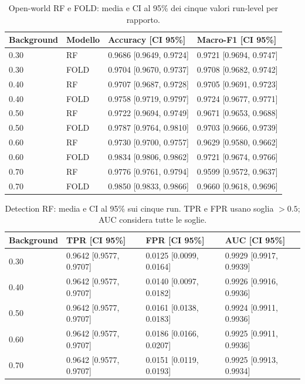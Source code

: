 \documentclass[11pt,a4paper]{article}
\begin{document}
\clearpage
\begin{table}[htbp]
\centering\scriptsize
\caption{Open-world RF e FOLD: media e CI al 95\% dei cinque valori run-level per rapporto.}
\label{tab:crossrun-open-performance-complete}
\begin{tabular}{llll}
\toprule
Background & Modello & Accuracy [CI 95\%] & Macro-F1 [CI 95\%] \\
\midrule
0.30 & RF & 0.9686 [0.9649, 0.9724] & 0.9721 [0.9694, 0.9747] \\
0.30 & FOLD & 0.9704 [0.9670, 0.9737] & 0.9708 [0.9682, 0.9742] \\
0.40 & RF & 0.9707 [0.9687, 0.9728] & 0.9705 [0.9691, 0.9723] \\
0.40 & FOLD & 0.9758 [0.9719, 0.9797] & 0.9724 [0.9677, 0.9771] \\
0.50 & RF & 0.9722 [0.9694, 0.9749] & 0.9671 [0.9653, 0.9688] \\
0.50 & FOLD & 0.9787 [0.9764, 0.9810] & 0.9703 [0.9666, 0.9739] \\
0.60 & RF & 0.9730 [0.9700, 0.9757] & 0.9629 [0.9580, 0.9662] \\
0.60 & FOLD & 0.9834 [0.9806, 0.9862] & 0.9721 [0.9674, 0.9766] \\
0.70 & RF & 0.9776 [0.9761, 0.9794] & 0.9599 [0.9572, 0.9637] \\
0.70 & FOLD & 0.9850 [0.9833, 0.9866] & 0.9660 [0.9618, 0.9696] \\
\bottomrule
\end{tabular}
\end{table}
\begin{table}[htbp]
\centering\scriptsize
\caption{Detection RF: media e CI al 95\% sui cinque run. TPR e FPR usano soglia $>0.5$; AUC considera tutte le soglie.}
\label{tab:crossrun-open-detection-rf}
\begin{tabular}{llll}
\toprule
Background & TPR [CI 95\%] & FPR [CI 95\%] & AUC [CI 95\%] \\
\midrule
0.30 & 0.9642 [0.9577, 0.9707] & 0.0125 [0.0099, 0.0164] & 0.9929 [0.9917, 0.9939] \\
0.40 & 0.9642 [0.9577, 0.9707] & 0.0140 [0.0097, 0.0182] & 0.9926 [0.9916, 0.9936] \\
0.50 & 0.9642 [0.9577, 0.9707] & 0.0161 [0.0138, 0.0183] & 0.9924 [0.9911, 0.9936] \\
0.60 & 0.9642 [0.9577, 0.9707] & 0.0186 [0.0166, 0.0207] & 0.9925 [0.9911, 0.9936] \\
0.70 & 0.9642 [0.9577, 0.9707] & 0.0151 [0.0119, 0.0193] & 0.9925 [0.9913, 0.9934] \\
\bottomrule
\end{tabular}
\end{table}
\end{document}

